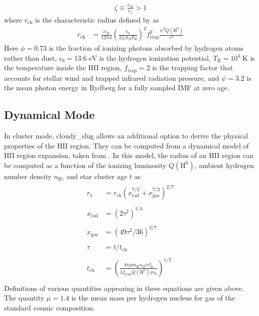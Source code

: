 \documentclass[letterpaper,10pt,english]{sphinxmanual}
\begin{document}
\begin{equation*}
\begin{split}\zeta \equiv \frac{r_{\mathrm{ch}}}{r_1} > 1\end{split}
\end{equation*}
where \(r_{\mathrm{ch}}\) is the
characteristic radius defined by  as
\begin{equation*}
\begin{split}r_{\mathrm{ch}} & = \frac{\alpha_B}{12\pi\phi}
\left(\frac{\epsilon_0}{2 f_e k_B T_{\mathrm{II}}}\right)^2
f_{\mathrm{trap}}^2 \frac{\psi^2 Q(\mathrm{H}^0)}{c^2}\end{split}
\end{equation*}
Here  \(\phi = 0.73\) is the fraction of ionizing photons absorbed
by hydrogen atoms rather than dust, \(\epsilon_0 =
13.6\;\mathrm{eV}\) is the hydrogen ionization potential,
\(T_{\mathrm{II}} = 10^4\;\mathrm{K}\) is the temperature inside
the HII region, \(f_{\mathrm{trap}} = 2\) is the trapping factor
that accounts for stellar wind and trapped infrared radiation
pressure, and \(\psi = 3.2\) is the mean photon energy in Rydberg for
a fully sampled IMF at zero age.


\subsection{Dynamical Mode}
\label{\detokenize{cloudy:dynamical-mode}}\label{\detokenize{cloudy:sssec-cloudy-dynamical-cluster-mode}}
In cluster mode, cloudy\_slug allows an additional option to derive the
physical properties of the HII region. They can be computed from a
dynamical model of HII region expansion, taken from .  In this model,
the radius of an HII region can be computed as a function of the
ionizing luminosity \(Q(\mathrm{H}^0)\), ambient hydrogen number
density \(n_{\mathrm{H}}\), and star cluster age \(t\) as
\begin{align*}\!\begin{aligned}
r_1 & = r_{\mathrm{ch}}
\left(x_{\mathrm{rad}}^{7/2} +
x_{\mathrm{gas}}^{7/2}\right)^{2/7} \\\\
x_{\mathrm{rad}} &= (2\tau^2)^{1/4} \\\\
x_{\mathrm{gas}} &= (49\tau^2/36)^{2/7} \\\\
\tau &= t/t_{\mathrm{ch}} \\\\
t_{\mathrm{ch}} & = \left(\frac{4\pi \mu m_{\mathrm{H}}
n_{\mathrm{H}} c r_{\mathrm{ch}}^4}{3 f_{\mathrm{trap}}
Q(\mathrm{H}^0) \psi \epsilon_0}\right)^{1/2}\\
\end{aligned}\end{align*}
Definitions of various quantities appearing in these equations are
given above. The quantity \(\mu = 1.4\) is the mean
mass per hydrogen nucleus for gas of the standard cosmic
composition.
\end{document}
